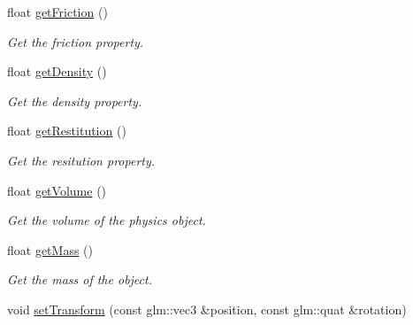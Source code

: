 \begin{DoxyCompactItemize}
\mbox{\label{classTarbora_1_1RigidBody_af0c50f3394ca1bf3f83ddcee2e30396d}} 
float \hyperlink{classTarbora_1_1RigidBody_af0c50f3394ca1bf3f83ddcee2e30396d}{get\+Friction} ()
\begin{DoxyCompactList}\small\item\em Get the friction property. \end{DoxyCompactList}\item 
\mbox{\label{classTarbora_1_1RigidBody_a247809c524822d19753753b4f0b1ea44}} 
float \hyperlink{classTarbora_1_1RigidBody_a247809c524822d19753753b4f0b1ea44}{get\+Density} ()
\begin{DoxyCompactList}\small\item\em Get the density property. \end{DoxyCompactList}\item 
\mbox{\label{classTarbora_1_1RigidBody_a62fd5b9616c9089c4e1835a333ba8058}} 
float \hyperlink{classTarbora_1_1RigidBody_a62fd5b9616c9089c4e1835a333ba8058}{get\+Restitution} ()
\begin{DoxyCompactList}\small\item\em Get the resitution property. \end{DoxyCompactList}\item 
float \hyperlink{classTarbora_1_1RigidBody_ae989466abcaf66c6b4dab5e865619a15}{get\+Volume} ()
\begin{DoxyCompactList}\small\item\em Get the volume of the physics object. \end{DoxyCompactList}\item 
\mbox{\label{classTarbora_1_1RigidBody_a13fc84c59cb7f027cbf69a464218c76e}} 
float \hyperlink{classTarbora_1_1RigidBody_a13fc84c59cb7f027cbf69a464218c76e}{get\+Mass} ()
\begin{DoxyCompactList}\small\item\em Get the mass of the object. \end{DoxyCompactList}\item 
\mbox{\label{classTarbora_1_1RigidBody_accab5fc63ffca7f3ad4389a35bb11298}} 
void \hyperlink{classTarbora_1_1RigidBody_accab5fc63ffca7f3ad4389a35bb11298}{set\+Transform} (const glm\+::vec3 \&position, const glm\+::quat \&rotation)

\end{DoxyCompactItemize}
